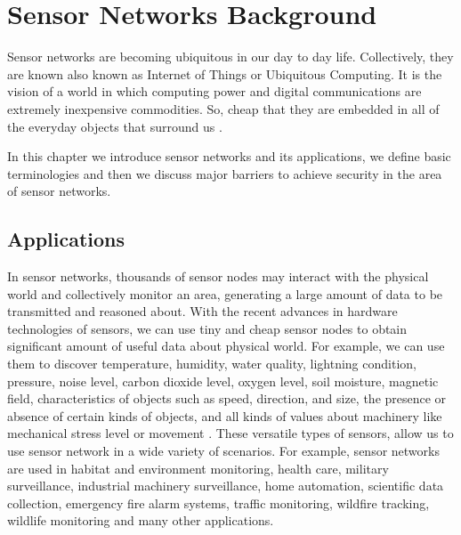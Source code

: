 \chapter{Sensor Networks Background} 
\label{cha:Sensor Networks/Data Aggregation/Security Background}
	
	Sensor networks are becoming ubiquitous in our day to day life. 
	Collectively, they are known also known as Internet of Things or Ubiquitous Computing.
	It is the vision of a world in which computing power and digital communications are extremely inexpensive commodities.
	So, cheap that they are embedded in all of the everyday objects that surround us \cite{2002-Stajano-ubiquitous}.
	
	In this chapter we introduce sensor networks and its applications, we define basic terminologies and then we discuss major 
	barriers to achieve security in the area of sensor networks.

\section{Applications}
	In sensor networks, thousands of sensor nodes may interact with the physical world and collectively monitor an area, generating a large amount of data to be transmitted and reasoned about.
	With the recent advances in hardware technologies of sensors, we can use tiny and cheap sensor nodes to obtain significant amount of useful data about physical world.
	For example, we can use them to discover temperature, humidity, water quality, lightning condition, pressure, noise level, carbon dioxide level, oxygen level, soil moisture, magnetic field, characteristics of objects such as speed, direction, and size, the presence or absence of certain kinds of objects, and all kinds of values about machinery like mechanical stress level or movement \cite{hof2007applications}.
	These versatile types of sensors, allow us to use sensor network in a wide variety of scenarios.
	For example, sensor networks are used in habitat and environment monitoring, health care, military surveillance, industrial machinery surveillance, home automation, scientific data collection, emergency fire alarm systems, traffic monitoring, wildfire tracking, wildlife monitoring and many other applications.
	
